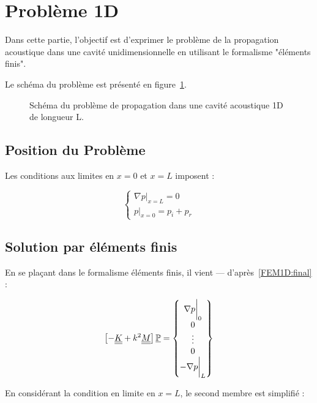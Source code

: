 \section{Problème 1D}

Dans cette partie, l'objectif est d'exprimer le problème de la propagation acoustique dans une cavité unidimensionnelle
en utilisant le formalisme "éléments finis".

Le schéma du problème est présenté en figure~\ref{fig:FEM:propa_1D}.

\begin{figure}[!ht]
	\centering
	
	\caption{\label{fig:FEM:propa_1D}Schéma du problème de propagation dans une cavité acoustique 1D de longueur L.}
\end{figure}

\subsection{Position du Problème}

Les conditions aux limites en $x=0$ et $x=L$ imposent :

\begin{equation}
	\left\{\begin{array}{l}
	\left.\nabla p\right|_{x=L} = 0\\
	\left.p\right|_{x=0} = p_i+p_r
	\end{array}\right. \label{FEM1D:BC}
\end{equation}

\subsection{Solution par éléments finis}

En se plaçant dans le formalisme éléments finis, il vient --- d'après~\eqref{FEM1D:final} :

\begin{equation}
	\left[- \underline{\underline{K}} + k^2\underline{\underline{M}}\right]\underline{\mathbb{P}} = \begin{Bmatrix} \nabla p\bigg|_0\\0\\\vdots\\0\\-\nabla p\bigg|_L\end{Bmatrix}
\end{equation}

En considérant la condition en limite en $x=L$, le second membre est simplifié :


